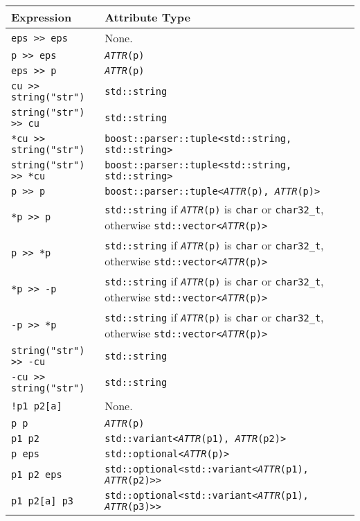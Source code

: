\begin{longtable}[]{@{}ll@{}}
\toprule\noalign{}
Expression & Attribute Type \\
\midrule\noalign{}
\endhead
\bottomrule\noalign{}
\endlastfoot
\texttt{eps >> eps} & None. \\
\texttt{p >> eps} & \emph{\texttt{ATTR}}\texttt{(p)} \\
\texttt{eps >> p} & \emph{\texttt{ATTR}}\texttt{(p)} \\
\texttt{cu >> string("str")} & \texttt{std::string} \\
\texttt{string("str") >> cu} & \texttt{std::string} \\
\texttt{*cu >> string("str")} & \texttt{boost::parser::tuple<std::string, std::string>} \\
\texttt{string("str") >> *cu} & \texttt{boost::parser::tuple<std::string, std::string>} \\
\texttt{p >> p} & \texttt{boost::parser::tuple<}\emph{\texttt{ATTR}}\texttt{(p), }\emph{\texttt{ATTR}}\texttt{(p)>} \\
\texttt{*p >> p} & \texttt{std::string} if \emph{\texttt{ATTR}}\texttt{(p)} is \texttt{char} or \texttt{char32\_t}, otherwise \texttt{std::vector<}\emph{\texttt{ATTR}}\texttt{(p)>} \\
\texttt{p >> *p} & \texttt{std::string} if \emph{\texttt{ATTR}}\texttt{(p)} is \texttt{char} or \texttt{char32\_t}, otherwise \texttt{std::vector<}\emph{\texttt{ATTR}}\texttt{(p)>} \\
\texttt{*p >> -p} & \texttt{std::string} if \emph{\texttt{ATTR}}\texttt{(p)} is \texttt{char} or \texttt{char32\_t}, otherwise \texttt{std::vector<}\emph{\texttt{ATTR}}\texttt{(p)>} \\
\texttt{-p >> *p} & \texttt{std::string} if \emph{\texttt{ATTR}}\texttt{(p)} is \texttt{char} or \texttt{char32\_t}, otherwise \texttt{std::vector<}\emph{\texttt{ATTR}}\texttt{(p)>} \\
\texttt{string("str") >> -cu} & \texttt{std::string} \\
\texttt{-cu >> string("str")} & \texttt{std::string} \\
\texttt{!p1 \textbar{} p2{[}a{]}} & None. \\
\texttt{p \textbar{} p} & \emph{\texttt{ATTR}}\texttt{(p)} \\
\texttt{p1 \textbar{} p2} & \texttt{std::variant<}\emph{\texttt{ATTR}}\texttt{(p1), }\emph{\texttt{ATTR}}\texttt{(p2)>} \\
\texttt{p \textbar{} }\texttt{eps} & \texttt{std::optional<}\emph{\texttt{ATTR}}\texttt{(p)>} \\
\texttt{p1 \textbar{} p2 \textbar{} eps} & \texttt{std::optional<std::variant<}\emph{\texttt{ATTR}}\texttt{(p1), }\emph{\texttt{ATTR}}\texttt{(p2)>>} \\
\texttt{p1 \textbar{} p2{[}a{]} \textbar{} p3} & \texttt{std::optional<std::variant<}\emph{\texttt{ATTR}}\texttt{(p1), }\emph{\texttt{ATTR}}\texttt{(p3)>>} \\
\end{longtable}

